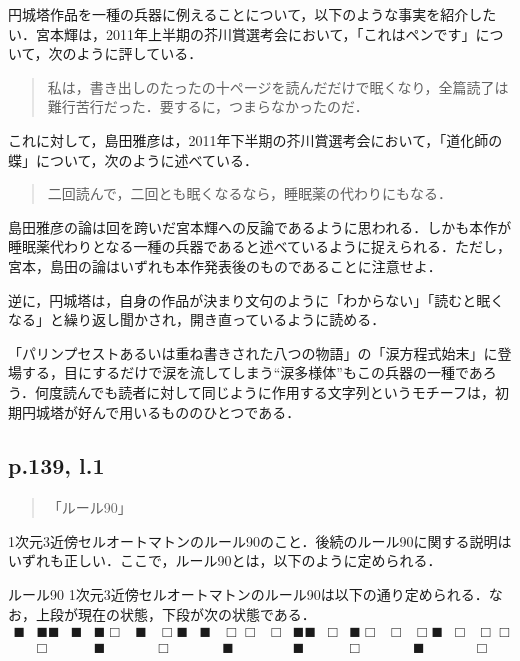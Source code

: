 \documentclass[10pt, a5paper, twoside]{ltjsarticle}
\begin{document}
            円城塔作品を一種の兵器に例えることについて，以下のような事実を紹介したい．宮本輝は，2011年上半期の芥川賞選考会において，「これはペンです」について，次のように評している\cite{bunshun1}．

            \begin{quote}
                私は，書き出しのたったの十ページを読んだだけで眠くなり，全篇読了は難行苦行だった．要するに，つまらなかったのだ．
            \end{quote}

            これに対して，島田雅彦は，2011年下半期の芥川賞選考会において，「道化師の蝶」について，次のように述べている\cite{bunshun2}．

            \begin{quote}
                二回読んで，二回とも眠くなるなら，睡眠薬の代わりにもなる．
            \end{quote}

            島田雅彦の論は回を跨いだ宮本輝への反論であるように思われる．しかも本作が睡眠薬代わりとなる一種の兵器であると述べているように捉えられる．ただし，宮本，島田の論はいずれも本作発表後のものであることに注意せよ．

            逆に，円城塔は，自身の作品が決まり文句のように「わからない」「読むと眠くなる」と繰り返し聞かされ，開き直っているように読める．

            「パリンプセストあるいは重ね書きされた八つの物語」の「涙方程式始末」に登場する，目にするだけで涙を流してしまう“涙多様体”もこの兵器の一種であろう．何度読んでも読者に対して同じように作用する文字列というモチーフは，初期円城塔が好んで用いるもののひとつである．

        \subsection{p.139, l.1}\label{rule90}

            \begin{quote}
                「ルール90」
            \end{quote}

            1次元3近傍セルオートマトンのルール90のこと．後続のルール90に関する説明はいずれも正しい．ここで，ルール90とは，以下のように定められる．

            \begin{dfn}{ルール90}{}
                1次元3近傍セルオートマトンのルール90は以下の通り定められる．なお，上段が現在の状態，下段が次の状態である．
                \begin{align*}
                    \blacksquare &\blacksquare \blacksquare & \blacksquare &\blacksquare \Box & \blacksquare &\Box \blacksquare & \blacksquare &\Box \Box & \Box &\blacksquare \blacksquare & \Box &\blacksquare \Box & \Box &\Box \blacksquare & \Box &\Box \Box\\ &\Box & &\blacksquare & &\Box & &\blacksquare & &\blacksquare & &\Box & &\blacksquare & &\Box
                \end{align*}
            \end{dfn}
\end{document}
